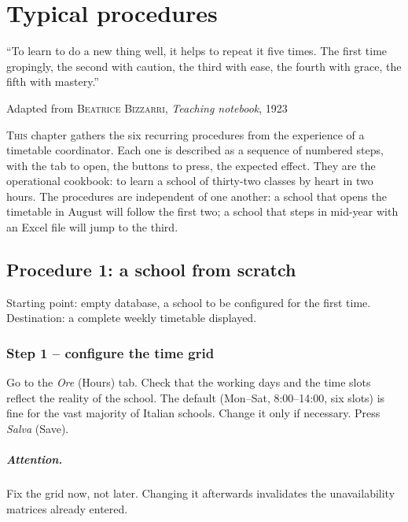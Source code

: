 \chapter{Typical procedures}
\label{ch:workflow_tipici}

\epigraph{``To learn to do a new thing well, it helps to repeat
it five times. The first time gropingly, the second with caution,
the third with ease, the fourth with grace, the fifth with
mastery.''}{Adapted from \textsc{Beatrice Bizzarri},
\emph{Teaching notebook}, 1923}

\lettrine[lines=3]{T}{his} chapter gathers the six recurring
procedures from the experience of a timetable coordinator. Each
one is described as a sequence of numbered steps, with the tab to
open, the buttons to press, the expected effect. They are the
operational cookbook: to learn a school of thirty-two classes by
heart in two hours. The procedures are independent of one another:
a school that opens the timetable in August will follow the first
two; a school that steps in mid-year with an Excel file will jump
to the third.


\section{Procedure 1: a school from scratch}
\label{sec:wf_da_zero}

Starting point: empty database, a school to be configured for the
first time. Destination: a complete weekly timetable displayed.

\subsection{Step 1 -- configure the time grid}

Go to the \emph{Ore} (Hours) tab. Check that the working days and
the time slots reflect the reality of the school. The default
(Mon--Sat, 8:00--14:00, six slots) is fine for the vast majority
of Italian schools. Change it only if necessary. Press
\emph{Salva} (Save).

\paragraph{Attention.} Fix the grid now, not later. Changing it
afterwards invalidates the unavailability matrices already
entered.

